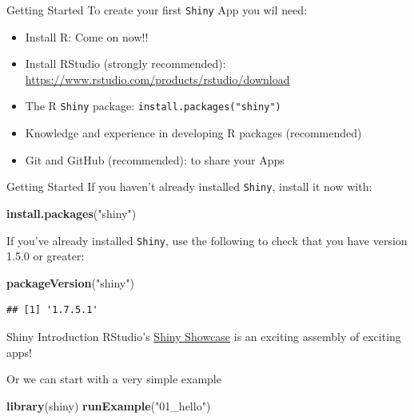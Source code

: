 \documentclass[
  ignorenonframetext,
]{beamer}
\newenvironment{Shaded}{\begin{snugshade}}{\end{snugshade}}
\newcommand{\FunctionTok}[1]{\textcolor[rgb]{0.13,0.29,0.53}{\textbf{#1}}}
\newcommand{\NormalTok}[1]{#1}
\newcommand{\StringTok}[1]{\textcolor[rgb]{0.31,0.60,0.02}{#1}}
\providecommand{\tightlist}{%
  \setlength{\itemsep}{0pt}\setlength{\parskip}{0pt}}
\begin{document}
\begin{frame}[fragile]{Getting Started}
\label{getting-started}
To create your first \texttt{Shiny} App you wil need:

\begin{itemize}
\tightlist
\item
  Install R: Come on now!!
\item
  Install RStudio (strongly recommended):
  \url{https://www.rstudio.com/products/rstudio/download}
\item
  The R \texttt{Shiny} package: \texttt{install.packages("shiny")}
\item
  Knowledge and experience in developing R packages (recommended)
\item
  Git and GitHub (recommended): to share your Apps
\end{itemize}
\end{frame}

\begin{frame}[fragile]{Getting Started}
\label{getting-started-1}
If you haven't already installed \texttt{Shiny}, install it now with:

\begin{Shaded}
\begin{Highlighting}[]
\FunctionTok{install.packages}\NormalTok{(}\StringTok{"shiny"}\NormalTok{)}
\end{Highlighting}
\end{Shaded}

If you've already installed \texttt{Shiny}, use the following to check
that you have version 1.5.0 or greater:

\begin{Shaded}
\begin{Highlighting}[]
\FunctionTok{packageVersion}\NormalTok{(}\StringTok{"shiny"}\NormalTok{) }
\end{Highlighting}
\end{Shaded}

\begin{verbatim}
## [1] '1.7.5.1'
\end{verbatim}
\end{frame}

\begin{frame}[fragile]{Shiny Introduction}
\label{shiny-introduction}
RStudio's
\href{www.rstudio.com/products/shiny/shiny-user-showcase/}{Shiny
Showcase} is an exciting assembly of exciting apps!

Or we can start with a very simple example

\begin{Shaded}
\begin{Highlighting}[]
\FunctionTok{library}\NormalTok{(shiny)}
\FunctionTok{runExample}\NormalTok{(}\StringTok{"01\_hello"}\NormalTok{)}
\end{Highlighting}
\end{Shaded}
\end{frame}
\end{document}
